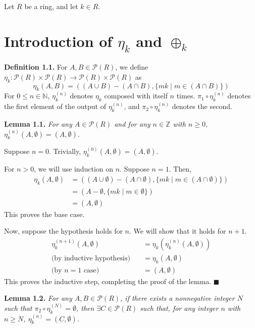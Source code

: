 \documentclass{article}
\newcommand{\zee}{\mathbb{Z}}
\newcommand{\N}{\mathbb{N}}
\begin{document}
Let $R$ be a ring, and let $k \in R$.

\section{Introduction of $\eta_k$ and $\oplus_k$}

\textbf{Definition 1.1.} For $A, B \in \mathcal{P}(R)$, we define
$\eta_k: \mathcal{P}(R) \times \mathcal{P}(R)
\rightarrow \mathcal{P}(R) \times \mathcal{P}(R)$ as
\[\eta_k(A, B) = ((A \cup B) - (A \cap B), \{mk \mid m \in (A \cap B)\})\]
For $0 \leq n \in \N$, $\eta_k^{(n)}$ denotes $\eta_k$ composed
with itself $n$ times. $\pi_1 \circ \eta_k^{(n)}$ denotes the first
element of the output of $\eta_k^{(n)}$, and $\pi_2 \circ \eta_k^{(n)}$
denotes the second.

\textbf{Lemma 1.1.} \textit{
    For any $A \in \mathcal{P}(R)$ and for any $n \in \zee$
    with $n \geq 0$,
    $\eta_k^{(n)}(A, \emptyset) = (A, \emptyset)$.
}

Suppose $n = 0$. Trivially,
$\eta_k^{(0)}(A, \emptyset) = (A, \emptyset)$.

For $n > 0$, we will use induction on $n$.
Suppose $n = 1$. Then,
\[\begin{split}
    \eta_k(A, \emptyset)
    &= ((A \cup \emptyset) - (A \cap \emptyset),
    \{mk \mid m \in (A \cap \emptyset)\}) \\
    &= (A - \emptyset, \{mk \mid m \in \emptyset\}) \\
    &= (A, \emptyset)
\end{split}\]
This proves the base case.

Now, suppose the hypothesis holds
for $n$. We will show that it holds for $n+1$.
\[\begin{split}
    \eta_k^{(n+1)}(A, \emptyset)
    &= \eta_k(\eta_k^{(n)}(A, \emptyset)) \\
    \text{(by inductive hypothesis)}\quad
    &= \eta_k(A, \emptyset) \\
    \text{(by $n=1$ case)}\quad
    &= (A, \emptyset)
\end{split}\]
This proves the inductive step, completing the proof of the
lemma. $\blacksquare$

\textbf{Lemma 1.2.} \textit{
    For any $A, B \in \mathcal{P}(R)$, if there exists a
    nonnegative integer $N$ such that
    $\pi_2 \circ \eta_k^{(N)} = \emptyset$,
    then $\exists C \in \mathcal{P}(R)$ such that,
    for any integer $n$ with $n \geq N$,
    $\eta_k^{(n)} = (C, \emptyset)$.
}
\end{document}
